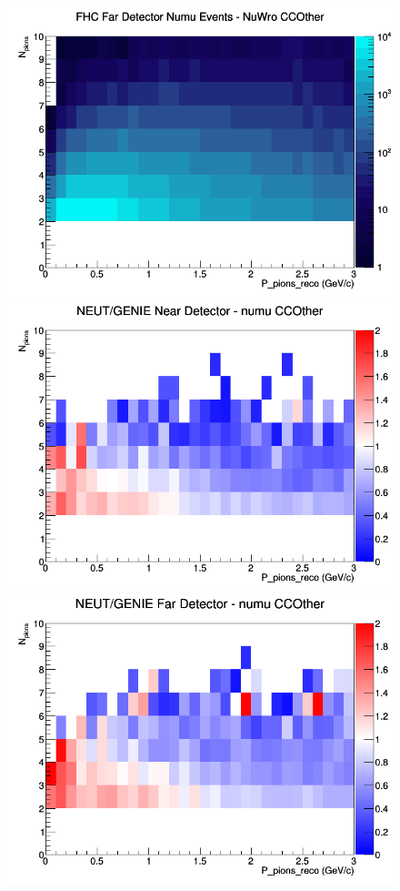 \documentclass[12pt]{article}
\begin{document}
\begin{figure}[h]
\endminipage
{}
\includegraphics[width=\linewidth]{eff_N_P/LAr/pions/CCOther_FHC_FD_numu_N_P_NuWro.png}
\endminipage
\newline
{}
\includegraphics[width=\linewidth]{eff_N_P/LAr/pions/ratios/CCOther_NEUT_GENIE_numu_near_N_P.png}
\endminipage
{}
\includegraphics[width=\linewidth]{eff_N_P/LAr/pions/ratios/CCOther_NEUT_GENIE_numu_far_N_P.png}

\end{figure}
\end{document}
